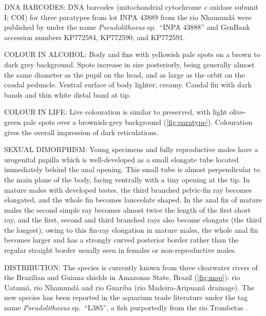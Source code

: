 \documentclass[12pt]{article}
\begin{document}
\noindent DNA BARCODES: DNA barcodes (mitochondrial cytochrome \emph{c} oxidase subunit I; COI) for three paratypes from lot INPA 43889 from the rio Nhamundá were published by \citet{Collins2015} under the name \emph{Pseudolithoxus} sp.\ ``INPA 43888'' and GenBank accession numbers KP772584, KP772590, and KP772591.\\%
\bigskip

\noindent COLOUR IN ALCOHOL:  Body and fins with yellowish pale spots on a brown to dark grey background. %
Spots increase in size posteriorly, being generally almost the same diameter as the pupil on the head, and as large as the orbit on the caudal peduncle. %
Ventral surface of body lighter, creamy. %
Caudal fin with dark bands and thin white distal band at tip.\\%
\bigskip

\noindent COLOUR IN LIFE: Live colouration is similar to preserved, with light olive-green pale spots over a brownish-grey background (\autoref{fig:paratype}). %
Colouration gives the overall impression of dark reticulations.\\%
\bigskip

\noindent SEXUAL DIMORPHISM: Young specimens and fully reproductive males have a urogenital papilla which is well-developed as a small elongate tube located immediately behind the anal opening. %
This small tube is almost perpendicular to the main plane of the body, facing ventrally with a tiny opening at the tip. %
In mature males with developed testes, the third branched pelvic-fin ray becomes elongated, and the whole fin becomes lanceolate shaped. %
In the anal fin of mature males the second simple ray becomes almost twice the length of the first short ray, and the first, second and third branched rays also become elongate (the third the longest); owing to this fin-ray elongation in mature males, the whole anal fin becomes larger and has a strongly curved posterior border rather than the regular straight border usually seen in females or non-reproductive males.\\%
\bigskip

\noindent DISTRIBUTION: The species is currently known from three clearwater rivers of the Brazilian and Guiana shields in Amazonas State, Brazil (\autoref{fig:map}): rio Uatumã, rio Nhamundá and rio Guariba (rio Madeira-Aripuanã drainage). %
The new species has been reported in the aquarium trade literature under the tag name \emph{Pseudolithoxus} sp.\ ``L385'', a fish purportedly from the rio Trombetas \citep{Seidel2005}.\\%
\bigskip
\end{document}
